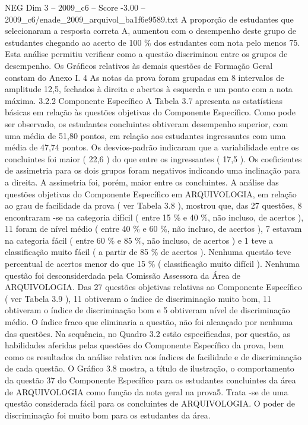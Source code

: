 \begin{textsample}{NEG Dim 3 – 2009\_c6 – Score -3.00 – 2009\_c6/enade\_2009\_arquivol\_ba1f6e9589.txt}
A proporção de estudantes que selecionaram a resposta correta A, aumentou com o desempenho deste grupo de estudantes chegando ao acerto de 100 \% dos estudantes com nota pelo menos 75.
Esta análise permitiu verificar como a questão discriminou entre os grupos de desempenho.
Os Gráficos relativos às demais questões de Formação Geral constam do Anexo I. 4 As notas da prova foram grupadas em 8 intervalos de amplitude 12,5, fechados à direita e abertos à esquerda e um ponto com a nota máxima. 3.2.2 Componente Específico A Tabela 3.7 apresenta as estatísticas básicas em relação às questões objetivas do Componente Específico.
Como pode ser observado, os estudantes concluintes obtiveram desempenho superior, com uma média de 51,80 pontos, em relação aos estudantes ingressantes com uma média de 47,74 pontos.
Os desvios-padrão indicaram que a variabilidade entre os concluintes foi maior ( 22,6 ) do que entre os ingressantes ( 17,5 ).
Os coeficientes de assimetria para os dois grupos foram negativos indicando uma inclinação para a direita.
A assimetria foi, porém, maior entre os concluintes.
A análise das questões objetivas do Componente Específico em ARQUIVOLOGIA, em relação ao grau de facilidade da prova ( ver Tabela 3.8 ), mostrou que, das 27 questões, 8 encontraram -se na categoria difícil ( entre 15 \% e 40 \%, não incluso, de acertos ), 11 foram de nível médio ( entre 40 \% e 60 \%, não incluso, de acertos ), 7 estavam na categoria fácil ( entre 60 \% e 85 \%, não incluso, de acertos ) e 1 teve a classificação muito fácil ( a partir de 85 \% de acertos ).
Nenhuma questão teve percentual de acertos menor do que 15 \% ( classificação muito difícil ).
Nenhuma questão foi desconsiderdada pela Comissão Assessora da Área de ARQUIVOLOGIA.
Das 27 questões objetivas relativas ao Componente Específico ( ver Tabela 3.9 ), 11 obtiveram o índice de discriminação muito bom, 11 obtiveram o índice de discriminação bom e 5 obtiveram nível de discriminação médio.
O índice fraco que eliminaria a questão, não foi alcançado por nenhuma das questões.
Na sequência, no Quadro 3.2 estão especificadas, por questão, as habilidades aferidas pelas questões do Componente Específico da prova, bem como os resultados da análise relativa aos índices de facilidade e de discriminação de cada questão.
O Gráfico 3.8 mostra, a título de ilustração, o comportamento da questão 37 do Componente Específico para os estudantes concluintes da área de ARQUIVOLOGIA como função da nota geral na prova5.
Trata -se de uma questão considerada fácil para os concluintes de ARQUIVOLOGIA.
O poder de discriminação foi muito bom para os estudantes da área.

\end{textsample}
